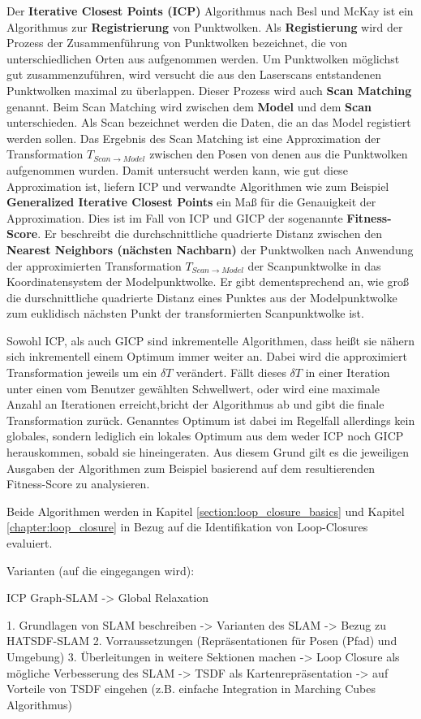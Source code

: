 Der \textbf{Iterative Closest Points (ICP)} Algorithmus nach Besl und McKay \cite{Besl:1992} ist ein Algorithmus zur \textbf{Registrierung} von Punktwolken.
Als \textbf{Registierung} wird der Prozess der Zusammenführung von Punktwolken bezeichnet, die von unterschiedlichen Orten aus aufgenommen werden. Um Punktwolken möglichst gut zusammenzuführen, wird versucht die aus den Laserscans entstandenen Punktwolken maximal zu überlappen. Dieser Prozess wird auch \textbf{Scan Matching} genannt.
Beim Scan Matching wird zwischen dem \textbf{Model} und dem \textbf{Scan} unterschieden.
Als Scan bezeichnet werden die Daten, die an das Model registiert werden sollen.
Das Ergebnis des Scan Matching ist eine Approximation der Transformation $T_{Scan \rightarrow Model}$ zwischen den Posen von denen aus die Punktwolken aufgenommen wurden.
Damit untersucht werden kann, wie gut diese Approximation ist, liefern ICP und verwandte Algorithmen wie zum Beispiel \textbf{Generalized Iterative Closest Points} \cite{segal2009generalized} ein Maß für die Genauigkeit der Approximation. Dies ist im Fall von ICP und GICP der sogenannte \textbf{Fitness-Score}. Er beschreibt die durchschnittliche quadrierte Distanz zwischen den \textbf{Nearest Neighbors (nächsten Nachbarn)} der Punktwolken nach Anwendung der approximierten Transformation $T_{Scan \rightarrow Model}$ der Scanpunktwolke in das Koordinatensystem der Modelpunktwolke.
Er gibt dementsprechend an, wie groß die durschnittliche quadrierte Distanz eines Punktes aus der Modelpunktwolke zum euklidisch nächsten Punkt der transformierten Scanpunktwolke ist.

Sowohl ICP, als auch GICP sind inkrementelle Algorithmen, dass heißt sie nähern sich inkrementell einem Optimum immer weiter an. Dabei wird die approximiert Transformation jeweils um ein $\delta T$ verändert. Fällt dieses $\delta T$ in einer Iteration unter einen vom Benutzer gewählten Schwellwert, oder wird eine maximale Anzahl an Iterationen erreicht,bricht der Algorithmus ab und gibt die finale Transformation zurück.
Genanntes Optimum ist dabei im Regelfall allerdings kein globales, sondern lediglich ein lokales Optimum aus dem weder ICP noch GICP herauskommen, sobald sie hineingeraten.
Aus diesem Grund gilt es die jeweiligen Ausgaben der Algorithmen zum Beispiel basierend auf dem resultierenden Fitness-Score zu analysieren. 

Beide Algorithmen werden in Kapitel \ref{section:loop_closure_basics} und Kapitel \ref{chapter:loop_closure} in Bezug auf die Identifikation von Loop-Closures evaluiert.


Varianten (auf die eingegangen wird): 

ICP
Graph-SLAM -> Global Relaxation


 

1. Grundlagen von SLAM beschreiben
-> Varianten des SLAM
-> Bezug zu HATSDF-SLAM
2. Vorraussetzungen (Repräsentationen für Posen (Pfad) und Umgebung)
3. Überleitungen in weitere Sektionen machen
	-> Loop Closure als mögliche Verbesserung des SLAM
	-> TSDF als Kartenrepräsentation
		-> auf Vorteile von TSDF eingehen (z.B. einfache Integration in Marching Cubes Algorithmus)